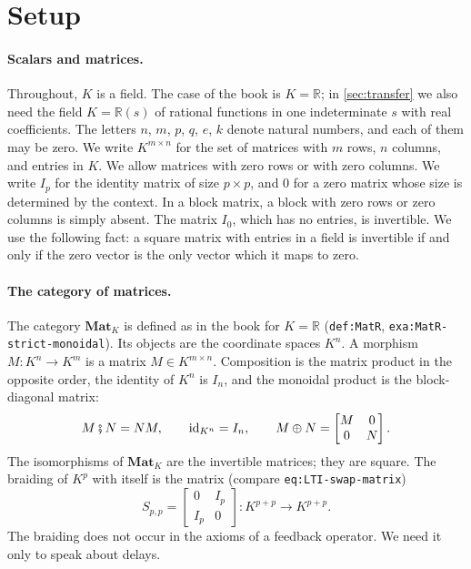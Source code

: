 \documentclass[11pt,a4paper]{article}
\theoremstyle{plain}
\theoremstyle{definition}
\theoremstyle{remark}
\newcommand{\R}{\mathbb{R}}
\newcommand{\Rs}{\mathbb{R}(s)}
\newcommand{\id}{\mathrm{id}}
\newcommand{\then}{\mathbin{\fatsemi}}
\newcommand{\Mat}{\mathbf{Mat}}
\newcommand{\lbl}[1]{\nolinkurl{#1}}
\begin{document}
\section{Setup}

\paragraph{Scalars and matrices.}
Throughout, $K$ is a field.
The case of the book is $K = \R$; in \cref{sec:transfer} we also need the field $K = \Rs$ of rational functions in one indeterminate $s$ with real coefficients.
The letters $n$, $m$, $p$, $q$, $e$, $k$ denote natural numbers, and each of them may be zero.
We write $K^{m \times n}$ for the set of matrices with $m$ rows, $n$ columns, and entries in $K$.
We allow matrices with zero rows or with zero columns.
We write $I_p$ for the identity matrix of size $p \times p$, and $0$ for a zero matrix whose size is determined by the context.
In a block matrix, a block with zero rows or zero columns is simply absent.
The matrix $I_0$, which has no entries, is invertible.
We use the following fact: a square matrix with entries in a field is invertible if and only if the zero vector is the only vector which it maps to zero.

\paragraph{The category of matrices.}
The category $\Mat_K$ is defined as in the book for $K = \R$ (\lbl{def:MatR}, \lbl{exa:MatR-strict-monoidal}).
Its objects are the coordinate spaces $K^n$.
A morphism $M \colon K^n \to K^m$ is a matrix $M \in K^{m \times n}$.
Composition is the matrix product in the opposite order, the identity of $K^n$ is $I_n$, and the monoidal product is the block-diagonal matrix:
\begin{equation}
    \label{eq:mat-operations}
    M \then N = N M,
    \qquad
    \id_{K^n} = I_n,
    \qquad
    M \oplus N = \begin{bmatrix} M & 0 \\ 0 & N \end{bmatrix} .
\end{equation}
The isomorphisms of $\Mat_K$ are the invertible matrices; they are square.
The braiding of $K^p$ with itself is the matrix (compare \lbl{eq:LTI-swap-matrix})
\begin{equation}
    \label{eq:swap}
    S_{p,p} = \begin{bmatrix} 0 & I_p \\ I_p & 0 \end{bmatrix} \colon K^{p+p} \to K^{p+p} .
\end{equation}
The braiding does not occur in the axioms of a feedback operator.
We need it only to speak about delays.
\end{document}
